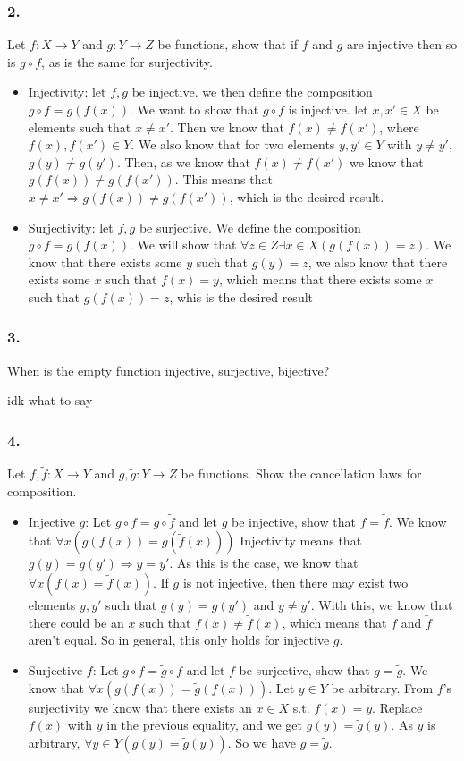 \subsubsection*{2.}
Let $f:X\rightarrow Y$ and $g:Y\rightarrow Z$ be functions, show that if $f$ and $g$ are injective then so is $g\circ f$, as is the same for surjectivity.
\begin{itemize}
\item{Injectivity:} let $f,g$ be injective. we then define the composition $g\circ f = g(f(x))$. We want to show that $g\circ f$ is injective. let $x,x'\in X$ be elements such that $x\neq x'$. Then we know that $f(x) \neq f(x')$, where $f(x),f(x')\in Y$. We also know that for two elements $y,y'\in Y$ with $y\neq y'$, $g(y)\neq g(y')$. Then, as we know that $f(x) \neq f(x')$ we know that $g(f(x)) \neq g(f(x'))$. This means that $x\neq x' \Rightarrow g(f(x)) \neq g(f(x'))$, which is the desired result.
\item{Surjectivity:} let $f,g$ be surjective. We define the composition $g\circ f = g(f(x))$. We will show that $\forall z\in Z\exists x\in X(g(f(x)) = z)$. We know that there exists some $y$ such that $g(y) = z$, we also know that there exists some $x$ such that $f(x) = y$, which means that there exists some $x$ such that $g(f(x)) = z$, whis is the desired result
\end{itemize}
\subsubsection*{3.}
When is the empty function injective, surjective, bijective? 

idk what to say
\subsubsection*{4.}
Let $f,\tilde f: X\rightarrow Y$ and $g,\tilde g:Y\rightarrow Z$ be functions. Show the cancellation laws for composition.
\begin{itemize}
	\item{Injective $g$: }Let $g\circ f = g\circ \tilde f$ and let $g$ be injective, show that $f=\tilde f$. We know that $\forall x (g(f(x)) = g(\tilde f(x)))$ Injectivity means that $g(y) = g(y') \Rightarrow y = y'$. As this is the case, we know that $\forall x( f(x)=\tilde f(x))$. If $g$ is not injective, then there may exist two elements $y,y'$ such that $g(y) = g(y')$ and $y\neq y'$. With this, we know that there could be an $x$ such that $f(x) \neq \tilde f(x)$, which means that $f$ and $\tilde f$ aren't equal. So in general, this only holds for injective $g$.
		\item{Surjective $f$: } Let $g\circ f =\tilde g\circ f$ and let $f$ be surjective, show that $g = \tilde g$. We know that $\forall x(g(f(x)) = \tilde g(f(x)))$. Let $y\in Y$ be arbitrary. From $f$'s surjectivity we know that there exists an $x\in X$ s.t. $f(x) = y$. Replace $f(x)$ with $y$ in the previous equality, and we get $g(y) = \tilde g(y)$. As $y$ is arbitrary, $\forall y\in Y(g(y) = \tilde g(y))$. So we have $g=\tilde g$.  
\end{itemize}
	
